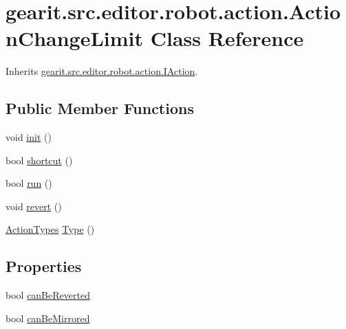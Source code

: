 \hypertarget{classgearit_1_1src_1_1editor_1_1robot_1_1action_1_1_action_change_limit}{\section{gearit.\+src.\+editor.\+robot.\+action.\+Action\+Change\+Limit Class Reference}
\label{classgearit_1_1src_1_1editor_1_1robot_1_1action_1_1_action_change_limit}
}


Inherits \hyperlink{interfacegearit_1_1src_1_1editor_1_1robot_1_1action_1_1_i_action}{gearit.\+src.\+editor.\+robot.\+action.\+I\+Action}.

\subsection*{Public Member Functions}
\begin{DoxyCompactItemize}
\item 
void \hyperlink{classgearit_1_1src_1_1editor_1_1robot_1_1action_1_1_action_change_limit_af2b67d5f9439b536974e046440bd06fc}{init} ()
\item 
bool \hyperlink{classgearit_1_1src_1_1editor_1_1robot_1_1action_1_1_action_change_limit_a13638028c2c6b02eb3653c785094c364}{shortcut} ()
\item 
bool \hyperlink{classgearit_1_1src_1_1editor_1_1robot_1_1action_1_1_action_change_limit_a0cd0d26e09932a11d1aadc404f58eb1a}{run} ()
\item 
void \hyperlink{classgearit_1_1src_1_1editor_1_1robot_1_1action_1_1_action_change_limit_a73f08614e389fc9aeb7197d77fef8413}{revert} ()
\item 
\hyperlink{namespacegearit_1_1src_1_1editor_1_1robot_1_1action_a4be0fd46e3952d6135136b20e7b3fc5e}{Action\+Types} \hyperlink{classgearit_1_1src_1_1editor_1_1robot_1_1action_1_1_action_change_limit_a3bcbd515a0217e7c97cd1c6d6ed00b99}{Type} ()
\end{DoxyCompactItemize}
\subsection*{Properties}
\begin{DoxyCompactItemize}
\item 
bool \hyperlink{classgearit_1_1src_1_1editor_1_1robot_1_1action_1_1_action_change_limit_ace97d8f95695e080c30d50d111791393}{can\+Be\+Reverted}
\item 
bool \hyperlink{classgearit_1_1src_1_1editor_1_1robot_1_1action_1_1_action_change_limit_abb4fb68a386e117f7ad9fd3810ed9ee8}{can\+Be\+Mirrored}
\end{DoxyCompactItemize}


